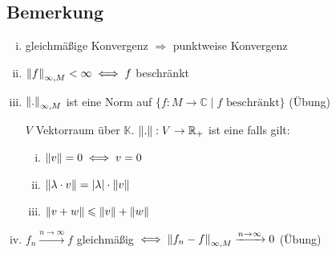 \subsection[Bemerkung zur Normen]{Bemerkung} %
\label{sub:12}
\begin{enumerate}[(i)]
	\item gleichmäßige Konvergenz $\Longrightarrow $ punktweise Konvergenz
	\item $\norm[\infty, M]{f} < \infty \iff f$ beschränkt
	\item \label{12:enum:3}$\norm[\infty, M]{.}$ ist eine Norm auf $\{ f: M \to \mathds{C} \mid f \text{ beschränkt}\}$ \hfill (Übung)
	
	$V$ Vektorraum über $\mathds{K}$. $\norm{.} : V \to \mathds{R}_+$ ist eine   falls gilt: 
	\begin{enumerate}[(i)]
		\item $\norm{v}=0 \iff v = 0$
		\item $\norm{\lambda \cdot v} = \abs*{\lambda } \cdot \norm{v}$
		\item $\norm{v+w} \le \norm{v} + \norm{w}$
	\end{enumerate}
	\item $f_n \xrightarrow{n \to \infty} f$ gleichmäßig $\iff \norm[\infty,M]{f_n -f} \xrightarrow{n \to \infty} 0$  \hfill (Übung)
\end{enumerate}

